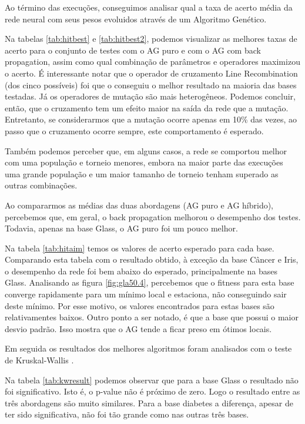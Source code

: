 \documentclass[12pt]{article}
\begin{document}
Ao término das execuções, conseguimos analisar qual a taxa de acerto média da rede neural com seus pesos evoluidos através de um Algoritmo Genético.

Na tabelas \ref{tab:hitbest} e \ref{tab:hitbest2}, podemos visualizar as melhores taxas de acerto para o conjunto de testes com o AG puro e com o AG com back propagation, assim como qual combinação de parâmetros e operadores maximizou o acerto.  É interessante notar que o operador de cruzamento Line Recombination (dos cinco possíveis) foi que o conseguiu o melhor resultado na maioria das bases testadas. Já os operadores de mutação são mais heterogêneos. Podemos concluir, então, que o cruzamento tem um efeito maior na saída da rede que a mutação. Entretanto, se considerarmos que a mutação ocorre apenas em 10\% das vezes, ao passo que o cruzamento ocorre sempre, este comportamento é esperado.

Também podemos perceber que, em alguns casos, a rede se comportou melhor com uma população e torneio menores, embora na maior parte das execuções uma grande população e um maior tamanho de torneio tenham superado as outras combinações.

Ao compararmos as médias das duas abordagens (AG puro e AG híbrido), percebemos que, em geral, o back propagation melhorou o desempenho dos testes. Todavia, apenas na base Glass, o AG puro foi um pouco melhor. 

Na tabela \ref{tab:hitaim} temos os valores de acerto esperado para cada base. Comparando esta tabela com o resultado obtido, à exceção da base Câncer e Iris, o desempenho da rede foi bem abaixo do esperado, principalmente na bases Glass. Analisando as figura \ref{fig:gla50.4}, percebemos que o fitness para esta base converge rapidamente para um mínimo local e estaciona, não conseguindo sair deste mínimo. Por esse motivo, os valores encontrados para estas bases são relativamentes baixos. Outro ponto a ser notado, é que a base que possui o maior desvio padrão. Isso mostra que o AG tende a ficar preso em ótimos locais.

Em seguida os resultados dos melhores algoritmos foram analisados com o teste de Kruskal-Wallis \cite{Kruskal}. 

Na tabela \ref{tab:kwresult} podemos observar que para a base Glass o resultado não foi significativo. Isto é, o p-value não é próximo de zero. Logo o resultado entre as três abordagens são muito similares. Para a base diabetes a diferença, apesar de ter sido significativa, não foi tão grande como nas outras três bases. 
\end{document}
